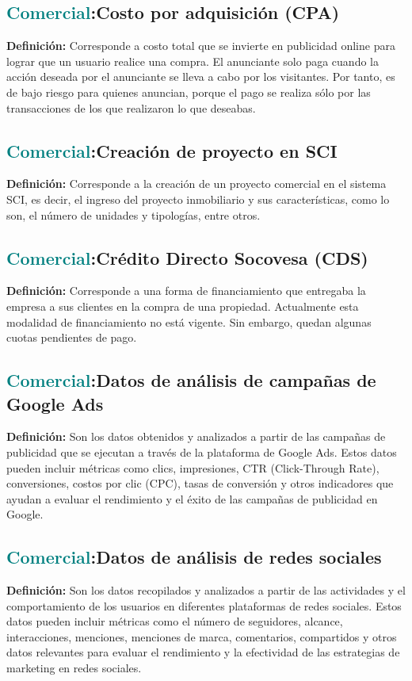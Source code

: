 \documentclass[12pt]{article}
\begin{document}
\subsection{\textcolor{teal}{Comercial}:{Costo por adquisición (CPA)}}
\textbf{Definición:} Corresponde a costo total que se invierte en publicidad online para lograr que un usuario realice una compra. El anunciante solo paga cuando la acción deseada por el anunciante se lleva a cabo por los visitantes. Por tanto, es de bajo riesgo para quienes anuncian, porque el pago se realiza sólo por las transacciones de los que realizaron lo que deseabas.
\subsection{\textcolor{teal}{Comercial}:{Creación de proyecto en SCI}}
\textbf{Definición:} Corresponde a la creación de un proyecto comercial en el sistema SCI, es decir, el ingreso del proyecto inmobiliario y sus características, como lo son, el número de unidades y tipologías, entre otros.
\subsection{\textcolor{teal}{Comercial}:{Crédito Directo Socovesa (CDS)}}
\textbf{Definición:} Corresponde a una forma de financiamiento que entregaba la empresa a sus clientes en la compra de una propiedad. Actualmente esta modalidad de financiamiento no está vigente. Sin embargo, quedan algunas cuotas pendientes de pago.
\subsection{\textcolor{teal}{Comercial}:{Datos de análisis de campañas de Google Ads}}
\textbf{Definición:} Son los datos obtenidos y analizados a partir de las campañas de publicidad que se ejecutan a través de la plataforma de Google Ads. Estos datos pueden incluir métricas como clics, impresiones, CTR (Click-Through Rate), conversiones, costos por clic (CPC), tasas de conversión y otros indicadores que ayudan a evaluar el rendimiento y el éxito de las campañas de publicidad en Google.
\subsection{\textcolor{teal}{Comercial}:{Datos de análisis de redes sociales}}
\textbf{Definición:} Son los datos recopilados y analizados a partir de las actividades y el comportamiento de los usuarios en diferentes plataformas de redes sociales. Estos datos pueden incluir métricas como el número de seguidores, alcance, interacciones, menciones, menciones de marca, comentarios, compartidos y otros datos relevantes para evaluar el rendimiento y la efectividad de las estrategias de marketing en redes sociales.
\end{document}

